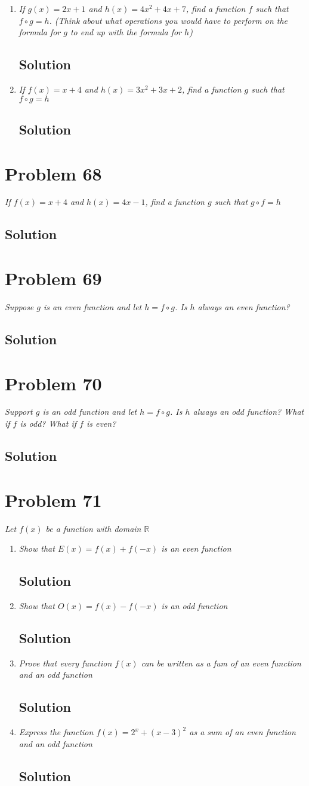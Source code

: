 \documentclass[11pt]{article}
\newcommand{\soln}{\subsection*}
\newcommand{\qn}{\textit}
\begin{document}
\begin{enumerate}
	\item \qn{If $g(x)=2x+1$ and $h(x)=4x^2+4x+7$, find a function $f$ such that $f \circ g=h$. (Think about what operations you would have to perform on the formula for $g$ to end up with the formula for $h$)}
	\soln{Solution}
	
	\item \qn{If $f(x)=x+4$ and $h(x)=3x^2+3x+2$, find a function $g$ such that $f \circ g=h$}
	\soln{Solution}
\end{enumerate}

\section*{Problem 68}

\qn{If $f(x)=x+4$ and $h(x)=4x-1$, find a function $g$ such that $g \circ f=h$}

\soln{Solution}

\section*{Problem 69}

\qn{Suppose $g$ is an even function and let $h=f \circ g$. Is $h$ always an even function?}

\soln{Solution}

\section*{Problem 70}

\qn{Support $g$ is an odd function and let $h=f \circ g$. Is $h$ always an odd function? What if $f$ is odd? What if $f$ is even?}

\soln{Solution}

\section*{Problem 71}

\qn{Let $f(x)$ be a function with domain $\mathbb{R}$}

\begin{enumerate}
	\item \qn{Show that $E(x)=f(x)+f(-x)$ is an even function}
	\soln{Solution}
	
	\item \qn{Show that $O(x)=f(x)-f(-x)$ is an odd function}
	\soln{Solution}
	
	\item \qn{Prove that every function $f(x)$ can be written as a fum of an even function and an odd function}
	\soln{Solution}
	
	\item \qn{Express the function $f(x)=2^x+(x-3)^2$ as a sum of an even function and an odd function}
	\soln{Solution}
\end{enumerate}
	
\end{document}
